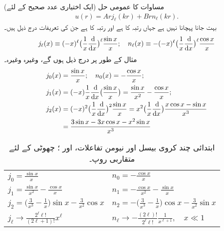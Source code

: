 (ایک اختیاری عدد صحیح  کے لئے) مساوات  کا عمومی حل
\begin{align}\label{مساوات_تین_ابعادی_کروی_بیسل_اور_نیومن_حل}
u(r)=Arj_{\ell}(kr)+Brn_{\ell}(kr). 
\end{align}
 بہت جانا پہچانا نہیں ہے  جہاں  رتبہ  کا   ہے اور  رتبہ  کا    ہے جن کی تعریفات درج ذیل ہیں۔  
\begin{align}\label{مساوات_ابعادی_تعریفات_کروی_بیسل_نیومن}
j_{\ell}(x)\equiv(-x)^{\ell}\big(\frac{1}{x}\frac{\dif}{\dif x}\big)^{\ell}\frac{\sin x}{x};\quad n_{\ell}(x)\equiv-(-x)^{\ell}
\big(\frac{1}{x}\frac{\dif}{\dif x}\big)^{\ell}\frac{\cos x}{x}
\end{align}
مثال کے طور پر درج ذیل ہوں گے، وغیرہ وغیرہ۔
\begin{align*}
j_{0}(x)&=\frac{\sin x}{x};\quad n_{0}(x)=-\frac{\cos x}{x};\\
j_1(x)&=(-x)\frac{1}{x}\frac{\dif}{\dif x}\big(\frac{\sin x}{x}\big)=\frac{\sin x}{x^{2}}-\frac{\cos x}{x};\\
j_{2}(x)&=(-x)^{2}\big(\frac{1}{x}\frac{\dif}{\dif x}\big)^{2}\frac{\sin x}{x}=x^{2}\big(\frac{1}{x}\frac{\dif}{\dif x}\big)\frac{x\cos x-\sin x}{x^{3}}\\
&=\frac{3\sin x-3x\cos x-x^2\sin x}{x^{3}}
\end{align*}
\begin{table}
\caption{
ابتدائی چند کروی بیسل اور نیومن تفاعلات،  اور ؛ چھوٹی  کے لئے متقاربی روپ۔
}
\label{جدول_ابعادی_کروی_بیسل_نیومن_تفاعلات}
\centering
\renewcommand{\arraystretch}{2} 
\begin{tabular}{ll}
\toprule
$j_0=\frac{\sin x}{x}$  &  $n_0=-\frac{\cos x}{x}$\\
$j_1=\frac{\sin x}{x^2}-\frac{\cos x}{x}$  &  $n_1=-\frac{\cos x}{x^2}-\frac{\sin x}{x}$\\
$j_2=\big(\frac{3}{x^3}-\frac{1}{x}\big)\sin x-\frac{3}{x^2}\cos x$  &  $n_2=-\big(\frac{3}{x^3}-\frac{1}{x}\big)\cos x-\frac{3}{x^2}\sin x$\\[0.5em]
\midrule
$j_{\ell}\to\frac{2^{\ell} \ell!}{(2\ell+1)!}x^{\ell}$  &  $n_{\ell}\to -\frac{(2\ell)!}{2^{\ell}\ell!}\frac{1}{x^{\ell+1}},\quad x\ll 1$\\
\bottomrule
\end{tabular}
\end{table}

